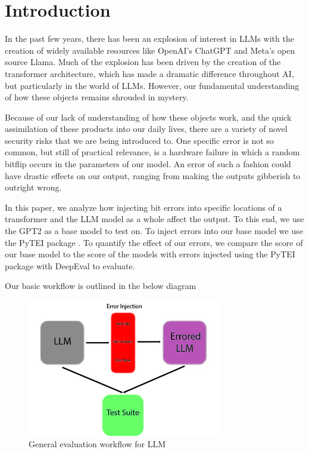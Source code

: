 \section{Introduction}
\label{sec:intro}

In the past few years, there has been an explosion of interest in LLMs with the creation of widely available resources like OpenAI's ChatGPT
and Meta's open source Llama. Much of the explosion has been driven by the creation of the transformer architecture, which has made a dramatic difference throughout AI, but particularly in the world of LLMs. However, our fundamental understanding of how these objects remains shrouded in mystery.

Because of our lack of understanding of how these objects work, and the quick assimilation of these products into our daily lives, there are a variety of novel security risks that we are being introduced to. One specific error is not so common, but still of practical relevance, is a hardware failure in which a random bitflip occurs in the parameters of our model. An error of such a fashion could have drastic effects on our output, ranging from making the outputs gibberish to outright wrong.

In this paper, we analyze how injecting bit errors into specific locations of a transformer and the LLM model as a whole affect the output. To this end, we use the GPT2 as a base model to test on. To inject errors into our base model we use the PyTEI package \cite{Ma23}. To quantify the effect of our errors, we compare the score of our base model to the score of the models with errors injected using the PyTEI package with DeepEval to evaluate.


Our basic workflow is outlined in the below diagram

\begin{figure}[ht]
	\begin{center}
		\includegraphics[height=6cm]{images/workflow.jpg}
		\caption{General evaluation workflow for LLM}
		\label{workflow}
	\end{center}
\end{figure}






